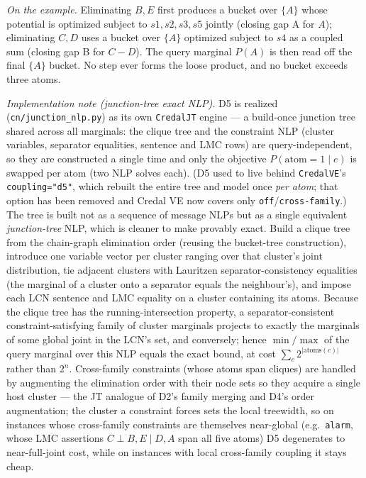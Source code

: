 \documentclass[11pt]{article}
\begin{document}
\smallskip\noindent\emph{On the example.} Eliminating $B,E$ first produces a bucket over
$\{A\}$ whose potential is optimized subject to $s1,s2,s3,s5$ jointly (closing gap A for
$A$); eliminating $C,D$ uses a bucket over $\{A\}$ optimized subject to $s4$ as a coupled
sum (closing gap B for $C\!-\!D$). The query marginal $P(A)$ is then read off the final
$\{A\}$ bucket. No step ever forms the loose product, and no bucket exceeds three atoms.

\smallskip\noindent\emph{Implementation note (junction-tree exact NLP).} D5 is realized
(\texttt{cn/junction\_nlp.py}) as its own \texttt{CredalJT} engine --- a build-once junction
tree shared across all marginals: the clique tree and the constraint NLP (cluster variables,
separator equalities, sentence and LMC rows) are query-independent, so they are constructed a
single time and only the objective $P(\mathrm{atom}{=}1\mid e)$ is swapped per atom (two NLP
solves each). (D5 used to live behind \texttt{CredalVE}'s \texttt{coupling="d5"}, which rebuilt
the entire tree and model once \emph{per atom}; that option has been removed and Credal VE now
covers only \texttt{off}/\texttt{cross-family}.) The tree is built not as a
sequence of message NLPs but as a single equivalent \emph{junction-tree} NLP, which is
cleaner to make provably exact. Build a clique tree from the chain-graph elimination order
(reusing the bucket-tree construction), introduce one variable vector per cluster ranging
over that cluster's joint distribution, tie adjacent clusters with Lauritzen
separator-consistency equalities (the marginal of a cluster onto a separator equals the
neighbour's), and impose each LCN sentence and LMC equality on a cluster containing its
atoms. Because the clique tree has the running-intersection property, a separator-consistent
constraint-satisfying family of cluster marginals projects to exactly the marginals of some
global joint in the LCN's set, and conversely; hence $\min/\max$ of the query marginal over
this NLP equals the exact bound, at cost $\sum_c 2^{|\mathrm{atoms}(c)|}$ rather than $2^n$.
Cross-family constraints (whose atoms span cliques) are handled by augmenting the
elimination order with their node sets so they acquire a single host cluster --- the JT
analogue of D2's family merging and D4's order augmentation; the cluster a constraint forces
sets the local treewidth, so on instances whose cross-family constraints are themselves
near-global (e.g.\ \texttt{alarm}, whose LMC assertions $C\perp B,E\mid D,A$ span all five
atoms) D5 degenerates to near-full-joint cost, while on instances with local cross-family
coupling it stays cheap.
\end{document}
